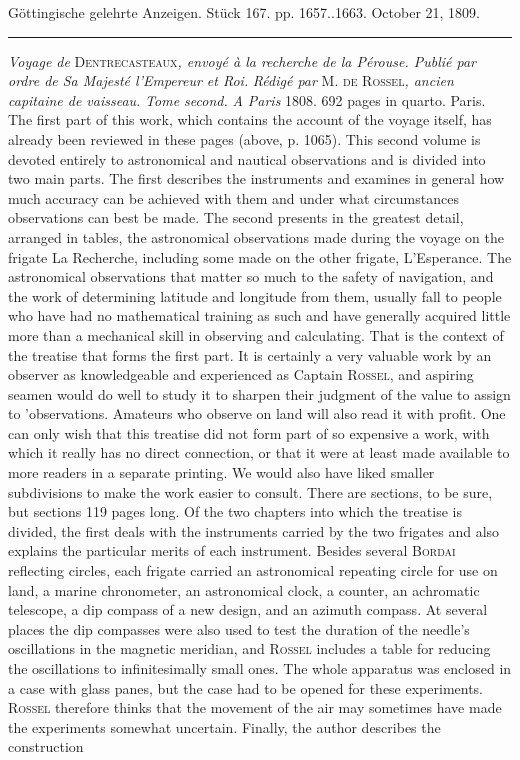 \clearpage
{}
\hypertarget{native-519-lower}{}\label{native-519-lower}
\begin{center}\small Göttingische gelehrte Anzeigen. Stück 167. pp. 1657..1663. October 21, 1809.\\[3pt]\rule{.72\linewidth}{.3pt}\end{center}

\emph{Voyage de} \textsc{Dentrecasteaux}\emph{, envoyé à la recherche de la Pérouse. Publié par ordre de Sa Majesté l'Empereur et Roi.} \emph{Rédigé par} M. \textsc{de Rossel}\emph{, ancien capitaine de vaisseau.} \emph{Tome second.} \emph{A Paris} 1808. 692 pages in quarto. Paris. The first part of this work, which contains the account of the voyage itself, has already been reviewed in these pages (above, p. 1065). This second volume is devoted entirely to astronomical and nautical observations and is divided into two main parts. The first describes the instruments and examines in general how much accuracy can be achieved with them and under what circumstances observations can best be made. The second presents in the greatest detail, arranged in tables, the astronomical observations made during the voyage on the frigate La Recherche, including some made on the other frigate, L'Esperance. The astronomical observations that matter so much to the safety of navigation, and the work of determining latitude and longitude from them, usually fall to people who have had no mathematical training as such and have generally acquired little more than a mechanical skill in observing and calculating. That is the context of the treatise that forms the first part. It is certainly a very valuable work by an observer as knowledgeable and experienced as Captain \textsc{Rossel}, and aspiring seamen would do well to study it to sharpen their judgment of the value to assign to 'observations. Amateurs who observe on land will also read it with profit. One can only wish that this treatise did not form part of so expensive a work, with which it really has no direct connection, or that it were at least made available to more readers in a separate printing. We would also have liked smaller subdivisions to make the work easier to consult. There are sections, to be sure, but sections 119 pages long. Of the two chapters into which the treatise is divided, the first deals with the instruments carried by the two frigates and also explains the particular merits of each instrument. Besides several \textsc{Bordai} reflecting circles, each frigate carried an astronomical repeating circle for use on land, a marine chronometer, an astronomical clock, a counter, an achromatic telescope, a dip compass of a new design, and an azimuth compass. At several places the dip compasses were also used to test the duration of the needle's oscillations in the magnetic meridian, and \textsc{Rossel} includes a table for reducing the oscillations to infinitesimally small ones. The whole apparatus was enclosed in a case with glass panes, but the case had to be opened for these experiments. \textsc{Rossel} therefore thinks that the movement of the air may sometimes have made the experiments somewhat uncertain. Finally, the author describes the construction 